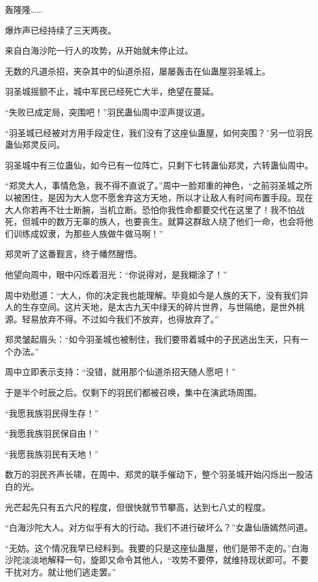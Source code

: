 
\begin{this_body}

轰隆隆……

爆炸声已经持续了三天两夜。

来自白海沙陀一行人的攻势，从开始就未停止过。

无数的凡道杀招，夹杂其中的仙道杀招，屡屡轰击在仙蛊屋羽圣城上。

羽圣城摇颤不止，城中军民已经死亡大半，绝望在蔓延。

“失败已成定局，突围吧！”羽民蛊仙周中涩声提议道。

“羽圣城已经被对方用手段定住，我们没有了这座仙蛊屋，如何突围？”另一位羽民蛊仙郑灵反问。

羽圣城中有三位蛊仙，如今已有一位阵亡，只剩下七转蛊仙郑灵，六转蛊仙周中。

“郑灵大人，事情危急，我不得不直说了。”周中一脸郑重的神色，“之前羽圣城之所以被困住，是因为大人您不愿舍弃这方天地，所以才让敌人有时间布置手段。现在大人你若再不壮士断腕，当机立断。恐怕你我性命都要交代在这里了！我不怕战死，但城中的数万无辜的族人，也要丧生。就算这群敌人绕了他们一命，也会将他们训练成奴隶，为那些人族做牛做马啊！”

郑灵听了这番觐言，终于幡然醒悟。

他望向周中，眼中闪烁着泪光：“你说得对，是我糊涂了！”

周中劝慰道：“大人，你的决定我也能理解。毕竟如今是人族的天下，没有我们异人的生存空间。这片天地，是太古九天中绿天的碎片世界，与世隔绝，是世外桃源。轻易放弃不得。不过如今我们不放弃，也得放弃了。”

郑灵皱起眉头：“如今羽圣城也被制住，我们要带着城中的子民逃出生天，只有一个办法。”

周中立即表示支持：“没错，就用那个仙道杀招天随人愿吧！”

于是半个时辰之后。仅剩下的羽民们都被召唤，集中在演武场周围。

“我愿我族羽民得生存！”

“我愿我族羽民保自由！”

“我愿我族羽民有天地！”

数万的羽民齐声长啸，在周中、郑灵的联手催动下，整个羽圣城开始闪烁出一股洁白的光。

光芒起先只有五六尺的程度，但很快就节节攀高，达到七八丈的程度。

“白海沙陀大人。对方似乎有大的行动。我们不进行破坏么？”女蛊仙唐嫣然问道。

“无妨。这个情况我早已经料到。我要的只是这座仙蛊屋，他们是带不走的。”白海沙陀淡淡地解释一句，旋即又命令其他人，“攻势不要停，就维持现状即可。不要干扰对方。就让他们逃走罢。”


\end{this_body}
